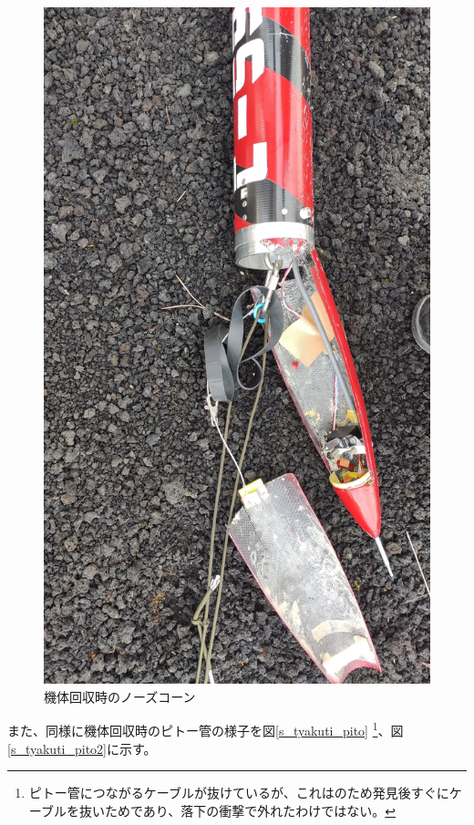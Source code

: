 \documentclass[a4paper,11pt,titlepage,uplatex]{jsarticle}
\begin{document}
\begin{itemize}
    \begin{figure}[H]
        \centering
        \includegraphics[scale = 0.1,angle = 270]{pic_str/s_tyakuti_noze.jpg}
        \caption{機体回収時のノーズコーン}
        \label{s_noze}
    \end{figure}

    また、同様に機体回収時のピトー管の様子を図\ref{s_tyakuti_pito}
    \footnote{ピトー管につながるケーブルが抜けているが、これはのため発見後すぐにケーブルを抜いためであり、落下の衝撃で外れたわけではない。}、図\ref{s_tyakuti_pito2}に示す。


\end{itemize}
\end{document}
